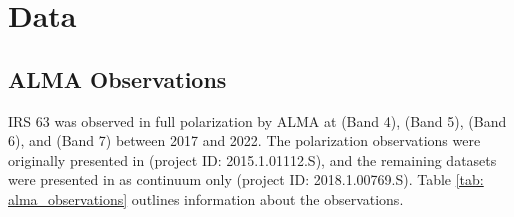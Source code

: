 \chapter{Data}
\label{ch_data}






\section{ALMA Observations}



IRS 63 was observed in full polarization by ALMA at \bfour (Band 4), \bfive (Band 5), \bsix (Band 6), and \bseven (Band 7) between 2017 and 2022. The \bandsixmm polarization observations were originally presented in \cite{sadavoy_dust_2019} (project ID: 2015.1.01112.S), and the remaining datasets were presented in \cite{tobin} as continuum only (project ID: 2018.1.00769.S). Table \ref{tab: alma_observations} outlines information about the observations.



